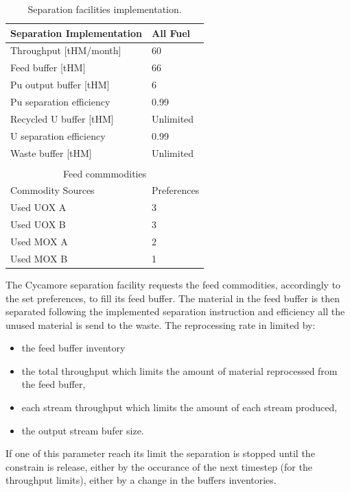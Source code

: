 \documentclass[12pt]{article}
\begin{document}
\begin{table}[h!]
    \centering
    \begin{tabular}{ll}
    \hline
    Separation Implementation  &  All Fuel   \\
    \hline
    Throughput [tHM/month]     &  60         \\
    Feed buffer [tHM]          &  66         \\
    Pu output buffer  [tHM]    &  6          \\
    Pu separation efficiency   &  0.99       \\
    Recycled U buffer [tHM]    &  Unlimited  \\
    U separation efficiency    &  0.99       \\
    Waste buffer [tHM]         &  Unlimited  \\ 
                                             \\
    \multicolumn{2}{c}{Feed commmodities}    \\
    \hline
    Commodity Sources         &  Preferences \\
    Used UOX A                &  3           \\
    Used UOX B                &  3           \\
    Used MOX A                &  2           \\
    Used MOX B                &  1           \\
    \hline
    \end{tabular}
    \caption{Separation facilities implementation.}
    \label{tab:fuelfab_2}
\end{table}

The Cycamore separation facility requests the feed commodities, accordingly to the
set preferences, to fill its feed buffer. The material in the feed buffer is then
separated following the implemented separation instruction and efficiency all the
unused material is send to the waste. The reprocessing rate in limited by:

\begin{itemize}

  \item the feed buffer inventory
  \item the total throughput which limits the amount of material reprocessed from
    the feed buffer,
  \item each stream throughput which limits the amount of each stream produced,
  \item the output stream bufer size.

\end{itemize}
If one of this parameter reach its limit the separation is stopped until the
constrain is release, either by the occurance of the next timestep (for the
throughput limits), either by a change in the buffers inventories. 
\end{document}

